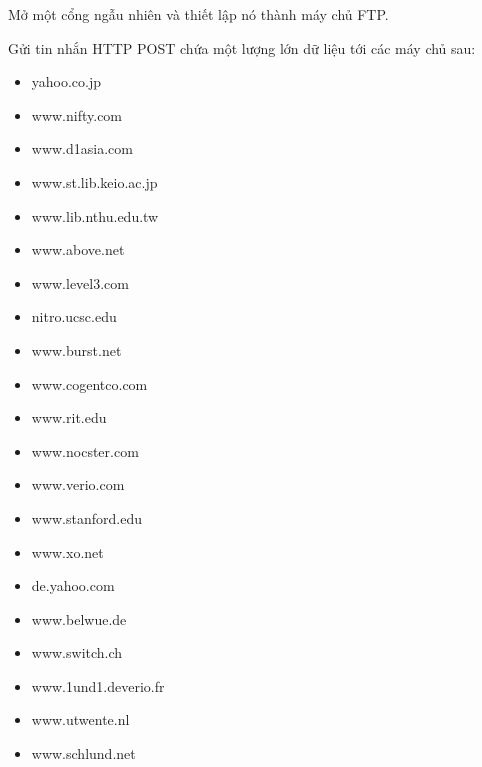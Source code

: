 Mở một cổng ngẫu nhiên và thiết lập nó thành máy chủ FTP.

Gửi tin nhắn HTTP POST chứa một lượng lớn dữ liệu tới các máy chủ sau:
\begin{itemize}
\item yahoo.co.jp
\item www.nifty.com
\item www.d1asia.com
\item www.st.lib.keio.ac.jp
\item www.lib.nthu.edu.tw
\item www.above.net
\item www.level3.com
\item nitro.ucsc.edu
\item www.burst.net
\item www.cogentco.com
\item www.rit.edu
\item www.nocster.com
\item www.verio.com
\item www.stanford.edu
\item www.xo.net
\item de.yahoo.com
\item www.belwue.de
\item www.switch.ch
\item www.1und1.deverio.fr
\item www.utwente.nl
\item www.schlund.net
\end{itemize}